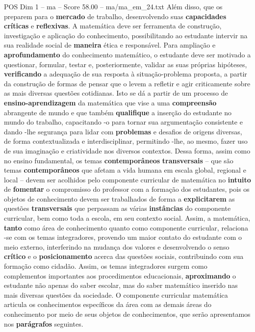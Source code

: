 \begin{textsample}{POS Dim 1 – ma – Score 58.00 – ma/ma\_em\_24.txt}
Além disso, que os preparem para o \textbf{mercado} de trabalho, desenvolvendo suas \textbf{capacidades} \textbf{críticas} e \textbf{reflexivas}.
A matemática deve ser ferramenta de construção, investigação e aplicação do conhecimento, possibilitando ao estudante intervir na sua realidade social de \textbf{maneira} ética e responsável.
Para ampliação e \textbf{aprofundamento} do conhecimento matemático, o estudante deve ser motivado a questionar, formular, testar e, posteriormente, validar as suas próprias hipóteses, \textbf{verificando} a adequação de sua resposta à situação-problema proposta, a partir da construção de formas de pensar que o levem a refletir e agir criticamente sobre as mais diversas questões cotidianas.
Isto se dá a partir de um processo de \textbf{ensino-aprendizagem} da matemática que vise a uma \textbf{compreensão} abrangente de mundo e que também \textbf{qualifique} a inserção do estudante no mundo do trabalho, capacitando -o para tornar sua argumentação consistente e dando -lhe segurança para lidar com \textbf{problemas} e desafios de origens diversas, de forma contextualizada e interdisciplinar, permitindo -lhe, ao mesmo, fazer uso de sua imaginação e criatividade nos diversos contextos.
Dessa forma, assim como no ensino fundamental, os temas \textbf{contemporâneos} \textbf{transversais} – que são temas \textbf{contemporâneos} que afetam a vida humana em escala global, regional e local – devem ser acolhidos pelo componente curricular de matemática no \textbf{intuito} de \textbf{fomentar} o compromisso do professor com a formação dos estudantes, pois os objetos de conhecimento devem ser trabalhados de forma a \textbf{explicitarem} as questões \textbf{transversais} que perpassam as várias \textbf{instâncias} do componente curricular, bem como toda a escola, em seu contexto social.
Assim, a matemática, \textbf{tanto} como área de conhecimento quanto como componente curricular, relaciona -se com os temas integradores, provendo um maior contato do estudante com o meio externo, interferindo na mudança dos valores e desenvolvendo o senso \textbf{crítico} e o \textbf{posicionamento} acerca das questões sociais, contribuindo com sua formação como cidadão.
Assim, os temas integradores surgem como complementos importantes aos procedimentos educacionais, \textbf{aproximando} o estudante não apenas do saber escolar, mas do saber matemático inserido nas mais diversas questões da sociedade.
O componente curricular matemática articula os conhecimentos específicos da área com as demais áreas do conhecimento por meio de seus objetos de conhecimentos, que serão apresentamos nos \textbf{parágrafos} seguintes.

\end{textsample}
